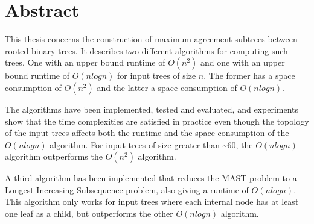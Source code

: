 \chapter*{Abstract}
This thesis concerns the construction of maximum agreement subtrees between rooted binary trees. It describes two different algorithms for computing such trees. One with an upper bound runtime of $O(n^2)$ and one with an upper bound runtime of $O(nlogn)$ for input trees of size $n$. The former has a space consumption of $O(n^2)$ and the latter a space consumption of $O(nlogn)$.

The algorithms have been implemented, tested and evaluated, and experiments show that the time complexities are satisfied in practice even though the topology of the input trees affects both the runtime and the space consumption of the $O(nlogn)$ algorithm. For input trees of size greater than \textasciitilde 60, the $O(nlogn)$ algorithm outperforms the $O(n^2)$ algorithm.

A third algorithm has been implemented that reduces the MAST problem to a Longest Increasing Subsequence problem, also giving a runtime of $O(nlogn)$. This algorithm only works for input trees where each internal node has at least one leaf as a child, but outperforms the other $O(nlogn)$ algorithm.
